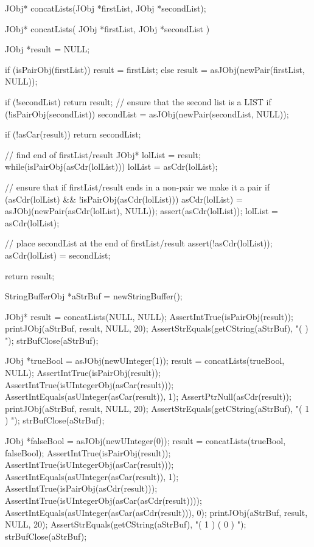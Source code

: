 \startTestSuite[concatLists]

\startCHeader
JObj* concatLists(JObj *firstList, JObj *secondList);
\stopCHeader

\startCCode
JObj* concatLists(
  JObj *firstList,
  JObj *secondList
) {
  JObj *result = NULL;
 
  if (isPairObj(firstList)) {
    result = firstList;
  } else {
    result = asJObj(newPair(firstList, NULL));
  }
 
  if (!secondList) return result;
  // ensure that the second list is a LIST
  if (!isPairObj(secondList)) {
    secondList = asJObj(newPair(secondList, NULL));
  }

  if (!asCar(result)) return secondList;
 
  // find end of firstList/result
  JObj* lolList = result;
  while(isPairObj(asCdr(lolList))) {
    lolList = asCdr(lolList);
  }

  // ensure that if firstList/result ends in a non-pair we make it a pair
  if (asCdr(lolList) && !isPairObj(asCdr(lolList))) {
    asCdr(lolList) = asJObj(newPair(asCdr(lolList), NULL));
    assert(asCdr(lolList));
    lolList = asCdr(lolList);
  }

  // place secondList at the end of firstList/result
  assert(!asCdr(lolList));
  asCdr(lolList) = secondList;
 
  return result;
}
\stopCCode

\startCTest
  StringBufferObj *aStrBuf = newStringBuffer();
  
  JObj* result = concatLists(NULL, NULL);
  AssertIntTrue(isPairObj(result));
  printJObj(aStrBuf, result, NULL, 20);
  AssertStrEquals(getCString(aStrBuf), "(  )  ");
  strBufClose(aStrBuf);
  
  JObj *trueBool  = asJObj(newUInteger(1));
  result = concatLists(trueBool, NULL);
  AssertIntTrue(isPairObj(result));
  AssertIntTrue(isUIntegerObj(asCar(result)));
  AssertIntEquals(asUInteger(asCar(result)), 1);
  AssertPtrNull(asCdr(result));
  printJObj(aStrBuf, result, NULL, 20);
  AssertStrEquals(getCString(aStrBuf), "( 1 )  ");
  strBufClose(aStrBuf);
  
  JObj *falseBool = asJObj(newUInteger(0));
  result = concatLists(trueBool, falseBool);
  AssertIntTrue(isPairObj(result));
  AssertIntTrue(isUIntegerObj(asCar(result)));
  AssertIntEquals(asUInteger(asCar(result)), 1);
  AssertIntTrue(isPairObj(asCdr(result)));
  AssertIntTrue(isUIntegerObj(asCar(asCdr(result))));
  AssertIntEquals(asUInteger(asCar(asCdr(result))), 0);
  printJObj(aStrBuf, result, NULL, 20);
  AssertStrEquals(getCString(aStrBuf), "( 1 ) ( 0 )  ");
  strBufClose(aStrBuf);
  

